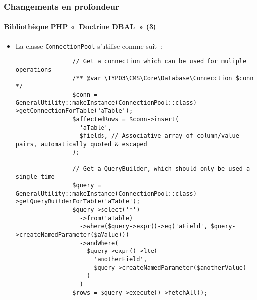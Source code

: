 \begin{frame}[fragile]
	\frametitle{Changements en profondeur}
	\framesubtitle{Bibliothèque PHP «~Doctrine DBAL~» (3)}

	\lstset{basicstyle=\tiny\ttfamily}

	\begin{itemize}

		\item La classe \texttt{ConnectionPool} s'utilise comme suit~:
			\begin{lstlisting}
				// Get a connection which can be used for muliple operations
				/** @var \TYPO3\CMS\Core\Database\Connecction $conn */
				$conn = GeneralUtility::makeInstance(ConnectionPool::class)->getConnectionForTable('aTable');
				$affectedRows = $conn->insert(
				  'aTable',
				  $fields, // Associative array of column/value pairs, automatically quoted & escaped
				);

				// Get a QueryBuilder, which should only be used a single time
				$query = GeneralUtility::makeInstance(ConnectionPool::class)->getQueryBuilderForTable('aTable');
				$query->select('*')
				  ->from('aTable)
				  ->where($query->expr()->eq('aField', $query->createNamedParameter($aValue)))
				  ->andWhere(
					$query->expr()->lte(
					  'anotherField',
					  $query->createNamedParameter($anotherValue)
					)
				  )
				$rows = $query->execute()->fetchAll();
			\end{lstlisting}
	\end{itemize}

\end{frame}

